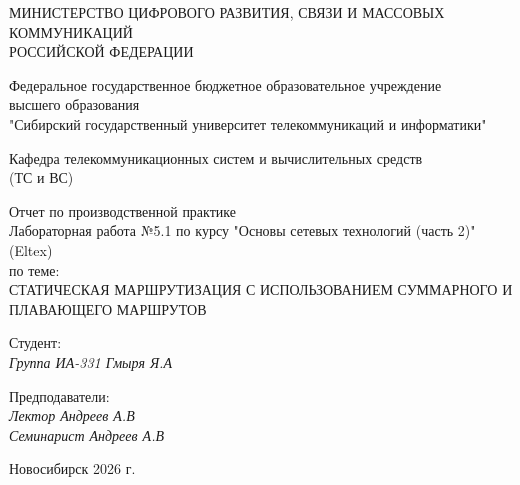 \thispagestyle{empty}

\begin{center}
    МИНИСТЕРСТВО ЦИФРОВОГО РАЗВИТИЯ, СВЯЗИ И МАССОВЫХ КОММУНИКАЦИЙ \\ РОССИЙСКОЙ ФЕДЕРАЦИИ

    \vspace{20pt}

    Федеральное государственное бюджетное образовательное учреждение  \\  высшего образования \\
    "Сибирский государственный университет телекоммуникаций и информатики" \\

    \vspace{20pt}

    Кафедра телекоммуникационных систем и вычислительных средств \\  (ТС и ВС)
\end{center}

\vfill

\begin{center}
    Отчет по производственной практике \\  
    Лабораторная работа №5.1 по курсу "Основы сетевых технологий (часть 2)" (Eltex) \\
    \vspace{20pt}
    по теме: \\
    \uppercase{Статическая маршрутизация с использованием суммарного и плавающего маршрутов}
\end{center}

\vfill

    \noindent Студент: \\
    \textit{Группа ИА-331 \hfill Гмыря Я.А} 

    \vspace{20pt}
 
    \noindent Предподаватели: \\
    \textit{Лектор \hfill Андреев А.В} \\
    \textit{Семинарист \hfill Андреев А.В}

\vfill

\begin{center}
    Новосибирск 2026 г.
\end{center}